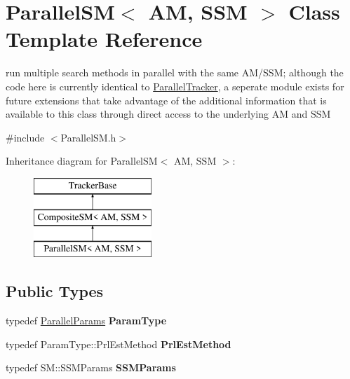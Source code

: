 \hypertarget{classParallelSM}{\section{Parallel\-S\-M$<$ A\-M, S\-S\-M $>$ Class Template Reference}
\label{classParallelSM}
}


run multiple search methods in parallel with the same A\-M/\-S\-S\-M; although the code here is currently identical to \hyperlink{classParallelTracker}{Parallel\-Tracker}, a seperate module exists for future extensions that take advantage of the additional information that is available to this class through direct access to the underlying A\-M and S\-S\-M  




{\ttfamily \#include $<$Parallel\-S\-M.\-h$>$}

Inheritance diagram for Parallel\-S\-M$<$ A\-M, S\-S\-M $>$\-:\begin{figure}[H]
\begin{center}
\leavevmode
\includegraphics[height=3.000000cm]{classParallelSM}
\end{center}
\end{figure}
\subsection*{Public Types}
\begin{DoxyCompactItemize}
\item 
\hypertarget{classParallelSM_aa5670bffef6eee89e429d6c92460877e}{typedef \hyperlink{structParallelParams}{Parallel\-Params} {\bfseries Param\-Type}}\label{classParallelSM_aa5670bffef6eee89e429d6c92460877e}

\item 
\hypertarget{classParallelSM_a94757ff4679ff9648d0f711ead5c09e7}{typedef Param\-Type\-::\-Prl\-Est\-Method {\bfseries Prl\-Est\-Method}}\label{classParallelSM_a94757ff4679ff9648d0f711ead5c09e7}

\item 
\hypertarget{classParallelSM_a1009fdfe10af0738bda26aa2870fa953}{typedef S\-M\-::\-S\-S\-M\-Params {\bfseries S\-S\-M\-Params}}\label{classParallelSM_a1009fdfe10af0738bda26aa2870fa953}

\end{DoxyCompactItemize}
